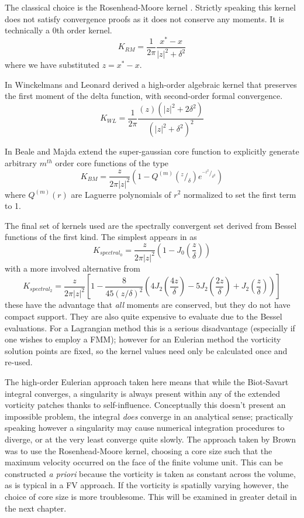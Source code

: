 \documentclass[letterpaper,12pt]{report}
\newcommand{\ben}[1]{\begin{equation}\label{#1}}
\newcommand{\ee}{\end{equation}}
\begin{document}
The classical choice is the Rosenhead-Moore kernel \cite{Rosenhead1930,Moore1972}. Strictly speaking this kernel does not satisfy convergence proofs as it does not conserve any moments. It is technically a 0th order kernel.
\ben{RMkern} K_{RM} = \frac{1}{2 \pi} \frac{x^*-x}{|z|^2+\delta^2} \ee
where we have substituted $z=x^*-x$.

In \cite{WL} Winckelmans and Leonard derived a high-order algebraic kernel that preserves the first moment of the delta function, with second-order formal convergence.
\ben{WLkern} K_{WL}=\frac{1}{2 \pi} \frac{(z)(|z|^2+2\delta^2)}{(|z|^2+\delta^2)^2} \ee

In \cite{BealeMajda} Beale and Majda extend the super-gaussian core function to explicitly generate arbitrary $m^{th}$ order core functions of the type
\ben{SGkern} K_{BM}= \frac{z}{2 \pi |z|^2} (1-Q^{(m)}(^z\!/_{\delta})e^{^{-z^2}\!/_{\delta^2}} )\ee
where $Q^{(m)}(r)$ are Laguerre polynomials of $r^2$ normalized to set the first term to 1.

The final set of kernels used are the spectrally convergent set derived from Bessel functions of the first kind. The simplest appears in \cite{WL} as
\ben{PSkern0}  K_{spectral_0}= \frac{z}{2 \pi |z|^2} (1-J_0(\frac{z}{\delta})) \ee
with a more involved alternative from \cite{HaldReview}
\ben{PSkern2}  K_{spectral_2}= \frac{z}{2 \pi |z|^2} \left[1-\frac{8}{45(z/\delta)^2}(4J_2(\frac{4z}{\delta})-5J_2(\frac{2z}{\delta})+J_2(\frac{z}{\delta}))\right] \ee
these have the advantage that \textit{all} moments are conserved, but they do not have compact support. They are also quite expensive to evaluate due to the Bessel evaluations. For a Lagrangian method this is a serious disadvantage (especially if one wishes to employ a FMM); however for an Eulerian method the vorticity solution points are fixed, so the kernel values need only be calculated once and re-used.

The high-order Eulerian approach taken here means that while the Biot-Savart integral converges, a singularity is always present within any of the extended vorticity patches thanks to self-influence. Conceptually this doesn't present an impossible problem, the integral \textit{does} converge in an analytical sense; practically speaking however a singularity may cause numerical integration procedures to diverge, or at the very least converge quite slowly. The approach taken by Brown \cite{Brown2004} was to use the Rosenhead-Moore kernel, choosing a core size such that the maximum velocity occurred on the face of the finite volume unit. This can be constructed \textit{a priori} because the vorticity is taken as constant across the volume, as is typical in a FV approach. If the vorticity is spatially varying however, the choice of core size is more troublesome. This will be examined in greater detail in the next chapter.
\end{document}
